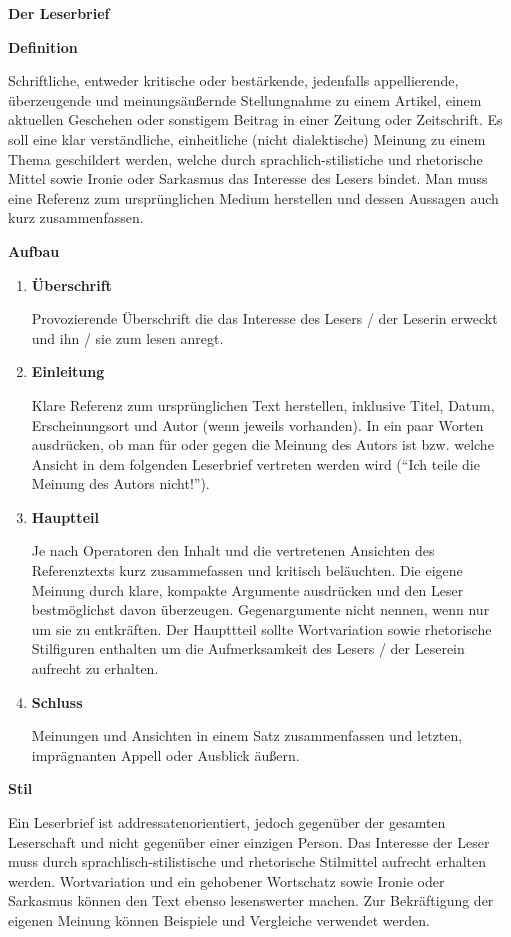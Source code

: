 \documentclass[12pt]{article}
\newcommand{\heading}[1]{\begin{center}\huge \textbf{#1} \end{center}}
\newcommand{\sub}[1]{{\Large \textbf{#1}}\par}
\newcommand{\zitat}[1]{\foreignquote{german}{#1}}
\begin{document}

\heading{Der Leserbrief}

\sub{Definition}

Schriftliche, entweder kritische oder best\"{a}rkende, jedenfalls appellierende, \"{u}berzeugende und meinungs\"{a}u\ss{}ernde Stellungnahme zu einem Artikel, einem aktuellen Geschehen oder sonstigem Beitrag in einer Zeitung oder Zeitschrift. Es soll eine klar verst\"{a}ndliche, einheitliche (nicht dialektische) Meinung zu einem Thema geschildert werden, welche durch sprachlich-stilistiche und rhetorische Mittel sowie Ironie oder Sarkasmus das Interesse des Lesers bindet. Man muss eine Referenz zum urspr\"{u}nglichen Medium herstellen und dessen Aussagen auch kurz zusammenfassen.

\sub{Aufbau}

\begin{enumerate}
  \item \textbf{\"{U}berschrift}
  \par
        Provozierende \"{U}berschrift die das Interesse des Lesers / der Leserin erweckt und ihn / sie zum lesen anregt.

  \item \textbf{Einleitung}
  \par
  Klare Referenz zum urspr\"{u}nglichen Text herstellen, inklusive Titel, Datum, Erscheinungsort und Autor (wenn jeweils vorhanden). In ein paar Worten ausdr\"{u}cken, ob man f\"{u}r oder gegen die Meinung des Autors ist bzw. welche Ansicht in dem folgenden Leserbrief vertreten werden wird (\zitat{Ich teile die Meinung des Autors nicht!}).

  \item \textbf{Hauptteil}
  \par
  Je nach Operatoren den Inhalt und die vertretenen Ansichten des Referenztexts kurz zusammefassen und kritisch bel\"{a}uchten. Die eigene Meinung durch klare, kompakte Argumente ausdr\"{u}cken und den Leser bestm\"{o}glichst davon \"{u}berzeugen. Gegenargumente nicht nennen, wenn nur um sie zu entkr\"{a}ften. Der Haupttteil sollte Wortvariation sowie rhetorische Stilfiguren enthalten um die Aufmerksamkeit des Lesers / der Leserein aufrecht zu erhalten.

  \item \textbf{Schluss}
  \par
  Meinungen und Ansichten in einem Satz zusammenfassen und letzten, impr\"{a}gnanten Appell oder Ausblick \"{a}u\ss{}ern.

\end{enumerate}

\sub{Stil}

Ein Leserbrief ist addressatenorientiert, jedoch gegen\"{u}ber der gesamten Leserschaft und nicht gegen\"{u}ber einer einzigen Person. Das Interesse der Leser muss durch sprachlisch-stilistische und rhetorische Stilmittel aufrecht erhalten werden. Wortvariation und ein gehobener Wortschatz sowie Ironie oder Sarkasmus k\"{o}nnen den Text ebenso lesenswerter machen. Zur Bekr\"{a}ftigung der eigenen Meinung k\"{o}nnen Beispiele und Vergleiche verwendet werden.
\end{document}

